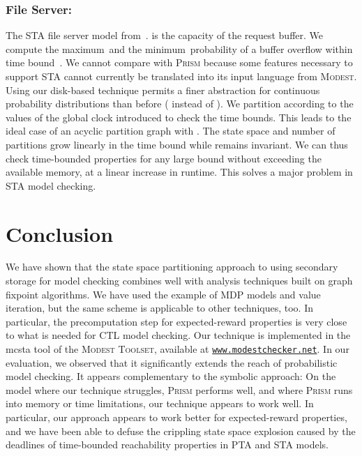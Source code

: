 \documentclass{llncs}
\newcommand{\modest}{\textsc{\mbox{Modest}}\xspace}
\newcommand{\mcsta}{\textsf{\mbox{mcsta}}\xspace}
\newcommand{\toolset}{\textsc{\mbox{Modest} Toolset}\xspace}
\newcommand{\prism}{\textsc{Prism}\xspace}
\begin{document}
\subsubsection{File Server:}

The STA file server model from~\cite{HHH14}.
 is the capacity of the request buffer.
We compute the maximum\ and the minimum\ probability of a buffer overflow within time bound~.
We cannot compare with \prism because some features necessary to support STA cannot currently be translated into its input language from \modest. 
Using our disk-based technique permits a finer abstraction for continuous probability distributions than before ( instead of ).
We partition according to the values of the global clock introduced to check the time bounds.
This leads to the ideal case of an acyclic partition graph with .
The state space and number of partitions grow linearly in the time bound while
 remains invariant.
We can thus check time-bounded properties for any large bound without exceeding the available memory, at a linear increase in runtime.
This solves a major problem in STA model checking.




\section{Conclusion}\label{sec:Conclusion}

We have shown that the state space partitioning approach to using secondary storage for model checking combines well with analysis techniques built on graph fixpoint algorithms.
We have used the example of MDP models and value iteration, but the same scheme is applicable to other techniques, too.
In particular, the precomputation step for expected-reward properties is very close to what is needed for CTL model checking.
Our technique is implemented in the \mcsta tool of the \toolset, available at \href{http://www.modestchecker.net/}{\texttt{www.modestchecker.net}}.
In our evaluation, we observed that it significantly extends the reach of probabilistic model checking.
It appears complementary to the symbolic approach:
On the model where our technique struggles, \prism performs well, and where \prism runs into memory or time limitations, our technique appears to work well.
In particular, our approach appears to work better for expected-reward properties, and we have been able to defuse the crippling state space explosion caused by the deadlines of time-bounded reachability properties in PTA and STA models.
\end{document}
